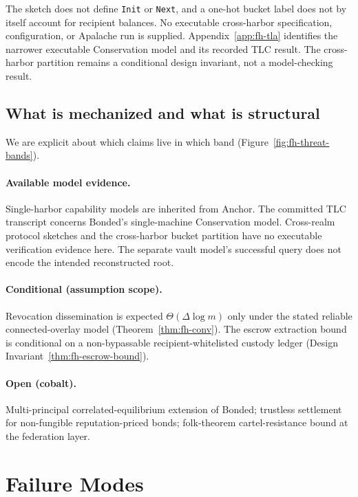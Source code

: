 \documentclass[11pt,a4paper]{article}
\theoremstyle{definition}
\theoremstyle{remark}
\begin{document}
The sketch does not define \texttt{Init} or \texttt{Next}, and a one-hot bucket label does not by itself account for recipient balances. No executable cross-harbor specification, configuration, or Apalache run is supplied. Appendix~\ref{app:fh-tla} identifies the narrower executable Conservation model and its recorded TLC result. The cross-harbor partition remains a conditional design invariant, not a model-checking result.

\subsection{What is mechanized and what is structural}\label{sec:fh-mech-summary}

We are explicit about which claims live in which band (Figure~\ref{fig:fh-threat-bands}).

\paragraph{Available model evidence.} Single-harbor capability models are inherited from Anchor. The committed TLC transcript concerns Bonded's single-machine Conservation model. Cross-realm protocol sketches and the cross-harbor bucket partition have no executable verification evidence here. The separate vault model's successful query does not encode the intended reconstructed root.

\paragraph{Conditional (assumption scope).} Revocation dissemination is expected $\Theta(\Delta\log m)$ only under the stated reliable connected-overlay model (Theorem~\ref{thm:fh-conv}). The escrow extraction bound is conditional on a non-bypassable recipient-whitelisted custody ledger (Design Invariant~\ref{thm:fh-escrow-bound}).

\paragraph{Open (cobalt).} Multi-principal correlated-equilibrium extension of Bonded; trustless settlement for non-fungible reputation-priced bonds; folk-theorem cartel-resistance bound at the federation layer.

\section{Failure Modes}\label{sec:fh-failure-modes}
\end{document}
